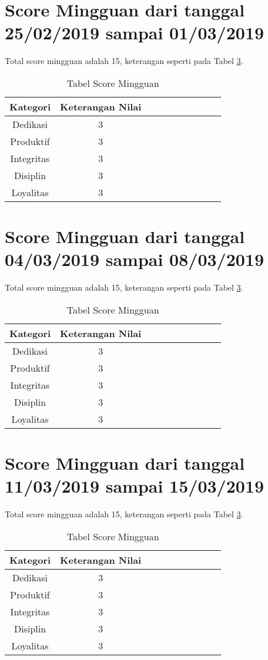 \section{Score Mingguan dari tanggal 25/02/2019 sampai 01/03/2019}
Total score mingguan adalah 15, keterangan seperti pada Tabel \ref{table:scoremingguan}.
\begin{table}[!ht]
\centering
\begin{tabular}{ |c|c|c|c|c|c|c|c|c|c| }
\hline
Kategori & Keterangan Nilai \\
\hline
Dedikasi & 3 \\
\hline
Produktif & 3 \\
\hline
Integritas & 3 \\
\hline
Disiplin & 3 \\
\hline
Loyalitas & 3 \\
\hline
\end{tabular}
\caption{Tabel Score Mingguan}
\label{table:scoremingguan}
\end{table}

\section{Score Mingguan dari tanggal 04/03/2019 sampai 08/03/2019}
Total score mingguan adalah 15,  keterangan seperti pada Tabel \ref{table:scoremingguan}.
\begin{table}[!ht]
\centering
\begin{tabular}{ |c|c|c|c|c|c|c|c|c|c| }
\hline
Kategori & Keterangan Nilai \\
\hline
Dedikasi & 3 \\
\hline
Produktif & 3 \\
\hline
Integritas & 3 \\
\hline
Disiplin & 3 \\
\hline
Loyalitas & 3 \\
\hline
\end{tabular}
\caption{Tabel Score Mingguan}
\label{table:scoremingguan}
\end{table}




\section{Score Mingguan dari tanggal 11/03/2019 sampai 15/03/2019}
Total score mingguan adalah 15,  keterangan seperti pada Tabel \ref{table:scoremingguan}.
\begin{table}[!ht]
\centering
\begin{tabular}{ |c|c|c|c|c|c|c|c|c|c| }
\hline
Kategori & Keterangan Nilai \\
\hline
Dedikasi & 3 \\
\hline
Produktif & 3 \\
\hline
Integritas & 3 \\
\hline
Disiplin & 3 \\
\hline
Loyalitas & 3 \\
\hline
\end{tabular}
\caption{Tabel Score Mingguan}
\label{table:scoremingguan}
\end{table}


